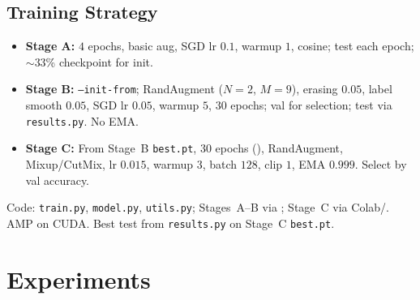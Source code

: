 \documentclass[11pt,a4paper]{article}
\begin{document}
\subsection{Training Strategy}
\begin{itemize}[leftmargin=1.2em, itemsep=0.15em, topsep=0.25em]
    \item \textbf{Stage A:} $4$ epochs, basic aug, SGD lr $0.1$, warmup $1$, cosine; test each epoch; $\sim$33\% checkpoint for init.
    \item \textbf{Stage B:} \texttt{--init-from}; RandAugment ($N{=}2$, $M{=}9$), erasing $0.05$, label smooth $0.05$, SGD lr $0.05$, warmup $5$, $30$ epochs; val for selection; test via \texttt{results.py}. No EMA.
    \item \textbf{Stage C:} From Stage~B \texttt{best.pt}, $30$ epochs (), RandAugment, Mixup/CutMix, lr $0.015$, warmup $3$, batch $128$, clip $1$, EMA $0.999$. Select by val accuracy.
\end{itemize}
Code: \texttt{train.py}, \texttt{model.py}, \texttt{utils.py}; Stages~A--B via ; Stage~C via Colab/. AMP on CUDA. Best test from \texttt{results.py} on Stage~C \texttt{best.pt}.

\section{Experiments}
\end{document}
